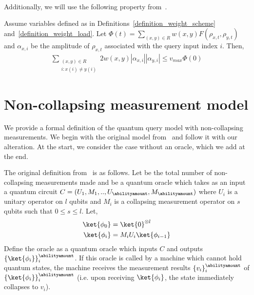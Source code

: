 Additionally, we will use the following property from~\cite{weighted_adversary}.
\begin{proposition}\label{proposition_weight_identity}
    Assume variables defined as in Definitions~\ref{definition_weight_scheme} and~\ref{definition_weight_load}. Let $\Phi(t) = \sum_{(x,y)\in R} w(x,y) F(\rho_{x,t}, \rho_{y,t})$ and $\alpha_{x,i}$ be the amplitude of $\rho_{x,t}$ associated with the query input index $i$. Then,
    \begin{align*}
        \sum_{\substack{(x,y)\in R \\ i: x(i)\neq y(i)}} 2 w(x,y) \left|\alpha_{x,i} \right| \left|\alpha_{y,i}\right| \leq  v_{max}\Phi(0)
    \end{align*}
\end{proposition}

\section{Non-collapsing measurement model}\label{section_pdqp_model}

We provide a formal definition of the quantum query model with non-collapsing measurements. We begin with the original model from~\cite{space_above_bqp} and follow it with our alteration. At the start, we consider the case without an oracle, which we add at the end.

The original definition from~\cite{space_above_bqp} is as follows. Let \abilityamount be the total number of non-collapsing measurements made and \pdqporacle be a quantum oracle which takes as an input a quantum circuit $C=(U_1, M_1, .., U_{\abilityamount}, M_{\abilityamount})$ where $U_i$ is a unitary operator on $l$ qubits and $M_i$ is a collapsing measurement operator on $s$ qubits such that $0\leq s\leq l$. Let,
\begin{align*}
    \ket{\phi_0} &=\ket{0}^{\otimes l} \\
    \ket{\phi_{i}} &= M_iU_i\ket{\phi_{i-1}}\\
\end{align*}
Define the oracle \pdqporacle as a quantum oracle which inputs $C$ and outputs $\{\ket{\phi_i}\}_i^{\abilityamount}$. If this oracle is called by a machine which cannot hold quantum states, the machine receives the measurement results $\{v_i\}_i^{\abilityamount}$ of $\{\ket{\phi_i}\}_i^{\abilityamount}$ (i.e. upon receiving $\ket{\phi_i}$, the state immediately collapses to $v_i$).

